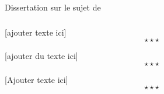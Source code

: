 \newpage \begin{bclogo}[barre=none,logo={}]{Dissertation sur le sujet de}
	\begin{center}
		\subsubsection*{}
	\end{center}
\end{bclogo}


[ajouter texte ici] $$\star \star \star$$


[ajouter du texte ici]$$\star \star \star$$


[Ajouter texte ici] $$\star \star \star$$
